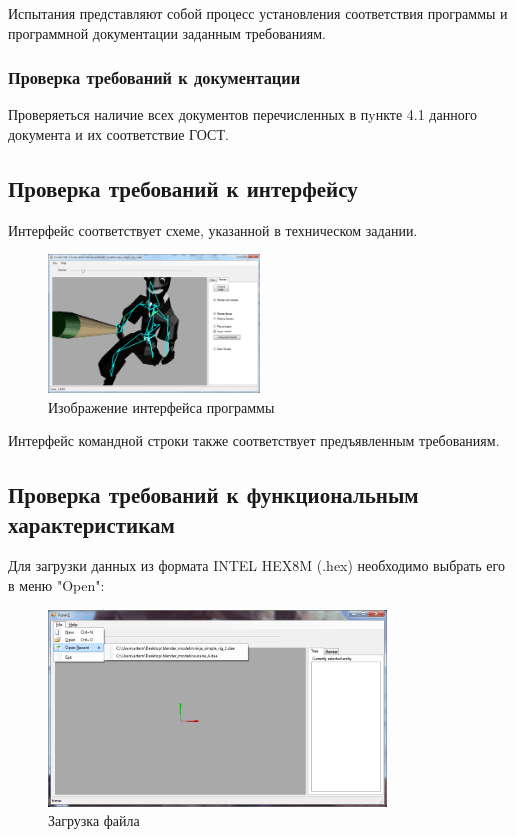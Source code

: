 Испытания представляют собой процесс установления соответствия программы и
программной документации заданным требованиям.

\subsubsection{Проверка требований к документации}
Проверяеться наличие всех документов перечисленных в пyнкте 4.1 данного документа и их соответствие ГОСТ.

\subsection{Проверка требований к интерфейсу}
Интерфейс соответствует схеме, указанной в техническом задании.

\begin{figure}[h!]
    \centering
    \includegraphics[width=0.5\textwidth]{../screenshots/interface_map.png}
    \caption{Изображение интерфейса программы}
\end{figure}

Интерфейс командной строки также соответствует предъявленным требованиям.

\subsection{Проверка требований к функциональным характеристикам}
Для загрузки данных из формата INTEL HEX8M (.hex) необходимо выбрать его в меню "Open":

\begin{figure}[h!]
    \centering
    \includegraphics[width=0.8\textwidth]{../screenshots/file_menu_with_recent.png}
    \caption{Загрузка файла}
\end{figure}

